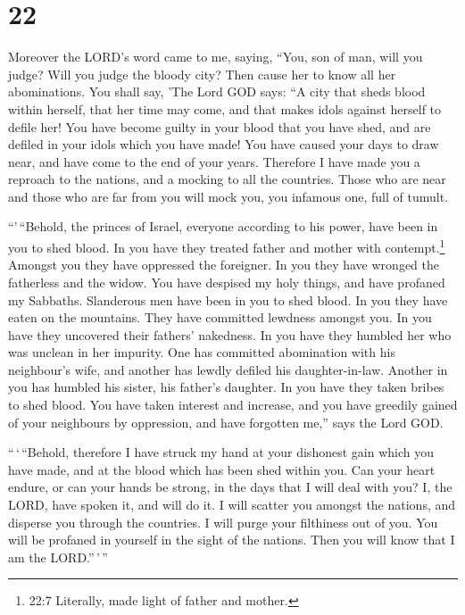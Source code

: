 \hypertarget{section-20}{%
\section{22}\label{section-20}}

 Moreover the LORD's word came to me, saying, 
``You, son of man, will you judge? Will you judge the bloody city? Then
cause her to know all her abominations.  You shall say, 'The
Lord GOD says: ``A city that sheds blood within herself, that her time
may come, and that makes idols against herself to defile her!
 You have become guilty in your blood that you have shed,
and are defiled in your idols which you have made! You have caused your
days to draw near, and have come to the end of your years. Therefore I
have made you a reproach to the nations, and a mocking to all the
countries.  Those who are near and those who are far from
you will mock you, you infamous one, full of tumult.

 ``'\,``Behold, the princes of Israel, everyone according to
his power, have been in you to shed blood.  In you have they
treated father and mother with contempt.\footnote{22:7 Literally, made
  light of father and mother.} Amongst you they have oppressed the
foreigner. In you they have wronged the fatherless and the widow.
 You have despised my holy things, and have profaned my
Sabbaths.  Slanderous men have been in you to shed blood. In
you they have eaten on the mountains. They have committed lewdness
amongst you.  In you have they uncovered their fathers'
nakedness. In you have they humbled her who was unclean in her impurity.
 One has committed abomination with his neighbour's wife,
and another has lewdly defiled his daughter-in-law. Another in you has
humbled his sister, his father's daughter.  In you have
they taken bribes to shed blood. You have taken interest and increase,
and you have greedily gained of your neighbours by oppression, and have
forgotten me,'' says the Lord GOD.

 ``\,`\,``Behold, therefore I have struck my hand at your
dishonest gain which you have made, and at the blood which has been shed
within you.  Can your heart endure, or can your hands be
strong, in the days that I will deal with you? I, the LORD, have spoken
it, and will do it.  I will scatter you amongst the
nations, and disperse you through the countries. I will purge your
filthiness out of you.  You will be profaned in yourself in
the sight of the nations. Then you will know that I am the
LORD.''\,'\,''

